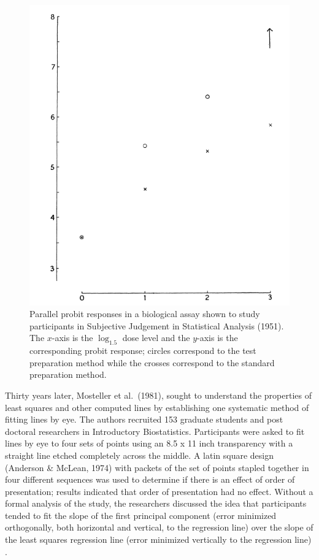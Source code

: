 \documentclass[print]{nuthesis}
\begin{document}
\begin{figure}[tbp]

{\centering \includegraphics[width=0.5\linewidth,]{images/02-you-draw-it/subjective-judgement-plot} 

}

\caption[Subjective Judgement in Statistical Analysis (1951) Parallel Probits]{Parallel probit responses in a biological assay shown to study participants in Subjective Judgement in Statistical Analysis (1951). The $x$-axis is the $\log_{1.5}$ dose level and the $y$-axis is the corresponding probit response; circles correspond to the test preparation method while the crosses correspond to the standard preparation method.}\label{fig:subjective-judgement}
\end{figure}

Thirty years later, Mosteller et al.~(1981), sought to understand the properties of least squares and other computed lines by establishing one systematic method of fitting lines by eye.
The authors recruited 153 graduate students and post doctoral researchers in Introductory Biostatistics.
Participants were asked to fit lines by eye to four sets of points  using an 8.5 x 11 inch transparency with a straight line etched completely across the middle.
A latin square design (Anderson \& McLean, 1974) with packets of the set of points stapled together in four different sequences was used to determine if there is an effect of order of presentation; results indicated that order of presentation had no effect.
Without a formal analysis of the study, the researchers discussed the idea that participants tended to fit the slope of the first principal component (error minimized orthogonally, both horizontal and vertical, to the regression line) over the slope of the least squares regression line (error minimized vertically to the regression line) .
\end{document}
